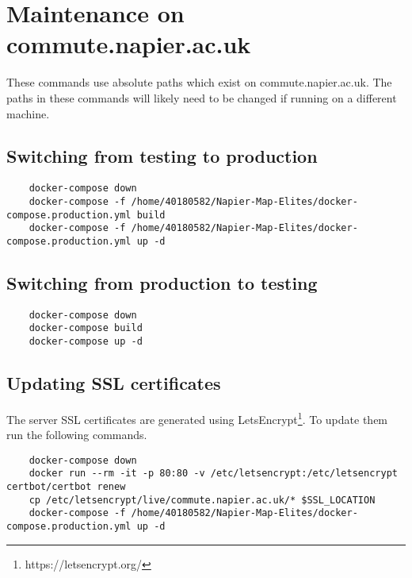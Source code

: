 \section{Maintenance on commute.napier.ac.uk}

These commands use absolute paths which exist on commute.napier.ac.uk. The paths in these commands will likely need to be changed if running on a different machine.

\subsection{Switching from testing to production}

\begin{verbatim}
	docker-compose down
	docker-compose -f /home/40180582/Napier-Map-Elites/docker-compose.production.yml build
	docker-compose -f /home/40180582/Napier-Map-Elites/docker-compose.production.yml up -d
\end{verbatim}

\subsection{Switching from production to testing}

\begin{verbatim}
	docker-compose down
	docker-compose build
	docker-compose up -d
\end{verbatim}

\subsection{Updating SSL certificates}

The server SSL certificates are generated using LetsEncrypt\footnote{https://letsencrypt.org/}. To update them run the following commands.

\begin{verbatim}
	docker-compose down
	docker run --rm -it -p 80:80 -v /etc/letsencrypt:/etc/letsencrypt certbot/certbot renew
	cp /etc/letsencrypt/live/commute.napier.ac.uk/* $SSL_LOCATION
	docker-compose -f /home/40180582/Napier-Map-Elites/docker-compose.production.yml up -d
\end{verbatim}
